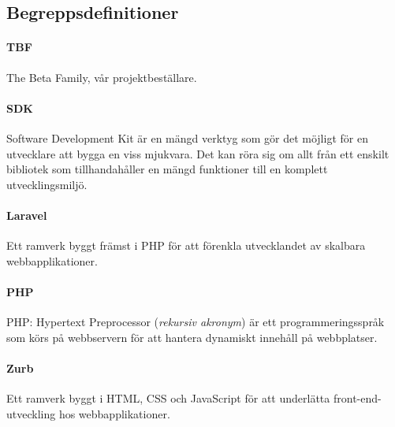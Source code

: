 \subsection{Begreppsdefinitioner}

\paragraph{TBF} The Beta Family, vår projektbeställare.

\paragraph{SDK} Software Development Kit är en mängd verktyg som gör det möjligt för en utvecklare att bygga en viss mjukvara. Det kan röra sig om allt från ett enskilt bibliotek som tillhandahåller en mängd funktioner till en komplett utvecklingsmiljö.

\paragraph{Laravel} Ett ramverk byggt främst i PHP för att förenkla utvecklandet av skalbara webbapplikationer\parencite{laravel}.

\paragraph{PHP} PHP: Hypertext Preprocessor (\textit{rekursiv akronym}) är ett programmeringsspråk som körs på webbservern för att hantera dynamiskt innehåll på webbplatser.

\paragraph{Zurb} Ett ramverk byggt i HTML, CSS och JavaScript för att underlätta front-end-utveckling hos webbapplikationer\parencite{zurb}.
